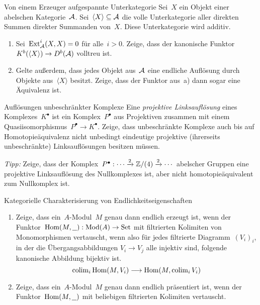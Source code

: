 \documentclass{uebblatt}
\begin{document}

\begin{aufgabe}{Von einem Erzeuger aufgespannte Unterkategorie}
Sei~$X$ ein Objekt einer abelschen Kategorie~$\mathcal{A}$. Sei~$\langle X \rangle
\subseteq \mathcal{A}$ die volle Unterkategorie aller direkten Summen direkter Summanden
von~$X$. Diese Unterkategorie wird additiv.
\begin{enumerate}
\item Sei~$\mathrm{Ext}_{\mathcal{A}}^i(X,X) = 0$ für alle~$i > 0$. Zeige, dass der kanonische
Funktor~$K^b(\langle X \rangle) \to D^b(\mathcal{A})$ volltreu ist.
\item Gelte außerdem, dass jedes Objekt aus~$\mathcal{A}$ eine endliche Auflösung durch Objekte
aus~$\langle X \rangle$ besitzt. Zeige, dass der Funktor aus~a) dann sogar eine
Äquivalenz ist.
\end{enumerate}
\end{aufgabe}

\begin{aufgabe}{Auflösungen unbeschränkter Komplexe}
Eine \emph{projektive Linksauflösung} eines Komplexes~$K^\bullet$ ist ein
Komplex~$P^\bullet$ aus Projektiven zusammen mit einem
Quasiisomorphismus~$P^\bullet \to K^\bullet$. Zeige, dass unbeschränkte
Komplexe auch bis auf Homotopieäquivalenz nicht unbedingt eindeutige projektive
(ihrerseits unbeschränkte) Linksauflösungen besitzen müssen.

{\tiny\emph{Tipp:} Zeige, dass der Komplex~$P^\bullet : \cdots \xrightarrow{2} \mathbb{Z}/(4)
\xrightarrow{2} \cdots$ abelscher Gruppen eine projektive Linksauflösung des
Nullkomplexes ist, aber nicht homotopieäquivalent zum Nullkomplex ist.\par}
\end{aufgabe}

\begin{aufgabe}{Kategorielle Charakterisierung von Endlichkeitseigenschaften}
\begin{enumerate}
\item Zeige, dass ein~$A$-Modul~$M$ genau dann endlich erzeugt ist, wenn der
Funktor~$\mathrm{Hom}(M,\underline{\ \ }) : \mathrm{Mod}(A) \to \mathrm{Set}$ mit filtrierten
Kolimiten von Monomorphismen vertauscht, wenn also für jedes filtrierte
Diagramm~$(V_i)_i$, in der die Übergangsabbildungen $V_i \to V_j$ alle injektiv
sind, folgende kanonische Abbildung bijektiv ist.
\[ \operatorname{colim}_i \mathrm{Hom}(M,V_i) \longrightarrow \mathrm{Hom}(M, \operatorname{colim}_i V_i) \]
\item Zeige, dass ein~$A$-Modul~$M$ genau dann endlich präsentiert ist, wenn
der Funktor~$\mathrm{Hom}(M,\underline{\ \ })$ mit beliebigen filtrierten Kolimiten
vertauscht.
\end{enumerate}
\end{aufgabe}
\end{document}
